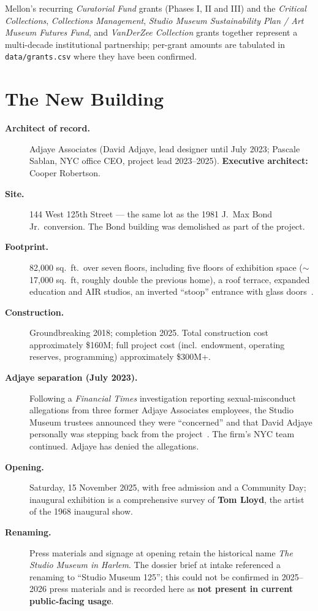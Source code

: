 \documentclass[10pt,letterpaper,twocolumn]{article}
\begin{document}
Mellon's recurring \emph{Curatorial Fund} grants (Phases I, II and III) and the \emph{Critical Collections}, \emph{Collections Management}, \emph{Studio Museum Sustainability Plan / Art Museum Futures Fund}, and \emph{VanDerZee Collection} grants together represent a multi-decade institutional partnership; per-grant amounts are tabulated in \texttt{data/grants.csv} where they have been confirmed.

\section{The New Building}

\begin{description}
\item[\textbf{Architect of record.}] Adjaye Associates (David Adjaye, lead designer until July 2023; Pascale Sablan, NYC office CEO, project lead 2023--2025). \textbf{Executive architect:} Cooper Robertson.
\item[\textbf{Site.}] 144 West 125th Street --- the same lot as the 1981 J.~Max Bond Jr.~conversion. The Bond building was demolished as part of the project.
\item[\textbf{Footprint.}] 82{,}000 sq.~ft.~over seven floors, including five floors of exhibition space (\(\sim\)17{,}000 sq.~ft, roughly double the previous home), a roof terrace, expanded education and AIR studios, an inverted ``stoop'' entrance with glass doors~\citep{archpaper2025smh}.
\item[\textbf{Construction.}] Groundbreaking 2018; completion 2025. Total construction cost approximately \$160M; full project cost (incl.~endowment, operating reserves, programming) approximately \$300M+.
\item[\textbf{Adjaye separation (July 2023).}] Following a \emph{Financial Times} investigation reporting sexual-misconduct allegations from three former Adjaye Associates employees, the Studio Museum trustees announced they were ``concerned'' and that David Adjaye personally was stepping back from the project~\citep{ft2023adjaye,artnews2023adjaye}. The firm's NYC team continued. Adjaye has denied the allegations.
\item[\textbf{Opening.}] Saturday, 15 November 2025, with free admission and a Community Day; inaugural exhibition is a comprehensive survey of \textbf{Tom Lloyd}, the artist of the 1968 inaugural show.
\item[\textbf{Renaming.}] Press materials and signage at opening retain the historical name \emph{The Studio Museum in Harlem}. The dossier brief at intake referenced a renaming to ``Studio Museum 125''; this could not be confirmed in 2025--2026 press materials and is recorded here as \textbf{not present in current public-facing usage}.
\end{description}
\end{document}

